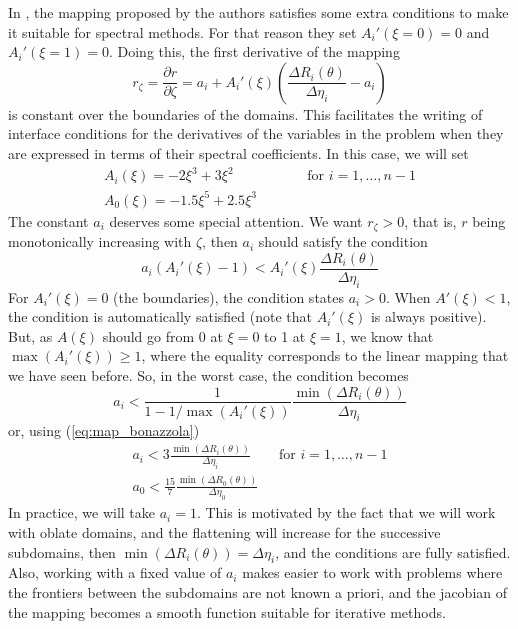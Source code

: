 In \citet{Bonazzola}, the mapping proposed by the authors satisfies some extra conditions to make it suitable
for spectral methods. For that reason they set $A_i'(\xi=0)=0$ and $A_i'(\xi=1)=0$. Doing
this, the first derivative of the mapping
\begin{equation}
r_\zeta=\frac{\partial r}{\partial\zeta}=a_i+A_i'(\xi)\left(\frac{\Delta R_i(\theta)}{\Delta\eta_i}-a_i\right)
\end{equation}
is constant over the boundaries of the domains. This facilitates the writing of interface conditions for
the derivatives of the variables in the problem when they are expressed in terms of their spectral coefficients.
In this case, we will set
\begin{eqnarray}
\label{eq:map_bonazzola}
A_i(\xi)=-2\xi^3+3\xi^2 &\qquad& \mbox{for $i=1,\ldots,n-1$}\\
A_0(\xi)=-1.5\xi^5+2.5\xi^3&&
\end{eqnarray}
The constant $a_i$ deserves some special attention. We want $r_\zeta>0$, that is, $r$ being monotonically 
increasing with $\zeta$, then $a_i$ should satisfy the condition
\begin{equation}
a_i(A_i'(\xi)-1)<A_i'(\xi)\frac{\Delta R_i(\theta)}{\Delta\eta_i}
\end{equation}
For $A_i'(\xi)=0$ (the boundaries), the condition states $a_i>0$.
When $A'(\xi)<1$, the condition is automatically satisfied (note that $A_i'(\xi)$ is always positive).
But, as $A(\xi)$ should go from 0 at $\xi=0$ to 1 at $\xi=1$, we know that $\max(A_i'(\xi))\ge1$, where the
equality corresponds to the linear mapping that we have seen before. So, in the worst case, the condition
becomes
\begin{equation}
a_i<\frac{1}{1-1/\max(A_i'(\xi))}\frac{\min(\Delta R_i(\theta))}{\Delta\eta_i}
\end{equation}
or, using (\ref{eq:map_bonazzola})
\begin{equation}
\begin{array}{l}
\displaystyle a_i<3\frac{\min(\Delta R_i(\theta))}{\Delta\eta_i} \qquad \mbox{for $i=1,\ldots,n-1$}\\
\displaystyle a_0<\frac{15}{7}\frac{\min(\Delta R_0(\theta))}{\Delta\eta_0}
\end{array}
\end{equation}
In practice, we will take $a_i=1$. This is motivated by the fact that we will work with oblate domains, and
the flattening will increase for the successive subdomains, then $\min(\Delta R_i(\theta))=\Delta\eta_i$,
and the conditions are fully satisfied. Also, working with a fixed value of $a_i$ makes easier to work
with problems where the frontiers between the subdomains are not known a priori, and the jacobian of 
the mapping becomes a smooth function suitable for iterative methods.

